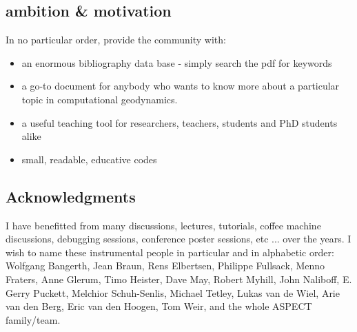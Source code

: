 \documentclass[a4paper]{article}
\begin{document}
\subsection{ambition \& motivation} %

In no particular order, provide the community with:
\begin{itemize}
\item an enormous bibliography data base - simply search the pdf for keywords
\item a go-to document for anybody who wants to know more about 
      a particular topic in computational geodynamics.
\item a useful teaching tool for researchers, teachers, students and PhD students alike 
\item small, readable, educative codes 
\end{itemize}

\subsection{Acknowledgments} %

I have benefitted from many discussions, lectures, tutorials, coffee machine 
discussions, debugging sessions, conference poster sessions, etc ... 
over the years. I wish to name these instrumental people in particular and 
in alphabetic order: 
Wolfgang Bangerth, 
Jean Braun, 
Rens Elbertsen,
Philippe Fullsack, 
Menno Fraters, 
Anne Glerum,
Timo Heister,
Dave May,
Robert Myhill,
John Naliboff,
E. Gerry Puckett,
Melchior Schuh-Senlis,
Michael Tetley,
Lukas van de Wiel,
Arie van den Berg, 
Eric van den Hoogen,
Tom Weir,
and the whole ASPECT family/team. 


\end{document}
